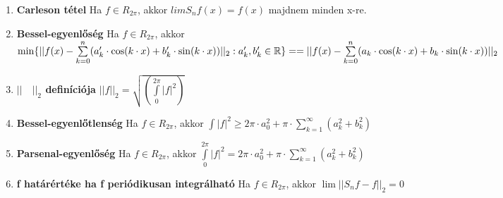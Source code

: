 \documentclass{article}
\begin{document}
\begin{enumerate}
	\item\textbf{Carleson tétel}\br
	Ha $f\in R_{2\pi}$, akkor $lim S_nf(x)=f(x)$ majdnem minden x-re.
	
	\item\textbf{Bessel-egyenlőség}\br
	Ha $f\in R_{2\pi}$, akkor $\min\{||f(x)-\sum\limits_{k=0}^{n} (a'_k\cdot\cos(k\cdot x)+
	b'_k\cdot\sin(k\cdot x))||_2 : a'_k, b'_k\in\R \} =\br= ||f(x)-\sum\limits_{k=0}^{n}
	(a_k\cdot\cos(k\cdot x)+b_k\cdot\sin(k\cdot x))||_2$
	\newpage
	
	\item\textbf{$||\quad||_2$ definíciója}\br
	$||f||_2 = \sqrt{(\int\limits_0^{2\pi} |f|^2)}$%
	
	\item\textbf{Bessel-egyenlőtlenség}\br
	Ha $f\in R_{2\pi}$, akkor $\int |f|^2\geq2\pi\cdot a_0^2+\pi\cdot
	\sum\limits_{k=1}^{\infty}(a_k^2+b_k^2)$
	
	\item\textbf{Parsenal-egyenlőség}\br
	Ha $f\in R_{2\pi}$, akkor $\int\limits_0^{2\pi}|f|^2=2\pi\cdot a_0^2+\pi\cdot
	\sum\limits_{k=1}^{\infty}(a_k^2 + b_k^2)$
	
	\item\textbf{f határértéke ha f periódikusan integrálható}\br
	Ha $f\in R_{2\pi}$, akkor $\lim||S_n f - f||_2=0$
\end{enumerate}
\end{document}
